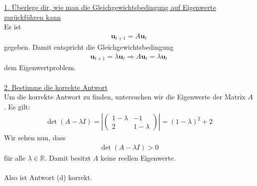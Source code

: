 \underline{1. Überlege dir, wie man die Gleichgewichtsbedingung auf Eigenwerte zurückführen kann}\\
Es ist
\begin{align*}
\textbf{u}_{t+1}= A \textbf{u}_t
\end{align*}
gegeben.
Damit entspricht die Gleichgewichtsbedingung
\begin{align*}
\textbf{u}_{t+1} = \lambda \textbf{u}_t 
\Rightarrow
A \textbf{u}_t = \lambda \textbf{u}_t 
\end{align*}
dem Eigenwertproblem.
\\
\\
\underline{2. Bestimme die korrekte Antwort}\\
Um die korrekte Antwort zu finden, untersuchen wir die Eigenwerte der Matrix $A$.
Es gilt:
\begin{align*}
\det(A - \lambda I) 
= 
\left| 
\begin{pmatrix}
1 - \lambda & -1 \\
2 	& 1 - \lambda
\end{pmatrix}
\right|
=
(1- \lambda)^2  + 2 
\end{align*}
Wir sehen nun, dass
\begin{align*}
\det(A - \lambda I) > 0
\end{align*}
für alle $\lambda \in \mathbb{R}$.
Damit besitzt $A$ keine reellen Eigenwerte.
\\
\\
Also ist Antwort (d) korrekt.

\newpage
